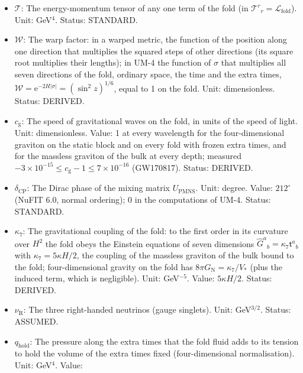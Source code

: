 \documentclass[
  10pt,
]{article}
\begin{document}
\begin{itemize}
  units of that of one neutrino species whose temperature is
  \((4/11)^{1/3}\) times that of the photons. Unit: dimensionless.
  Value: 3.044 (Standard Model); measured \(2.99 \pm 0.17\) (Planck
  2018). Status: STANDARD.
\item
  \(\mathcal{T}\): The energy-momentum tensor of any one term of the
  fold (in \(\mathcal{T}^r{}_r = \mathcal{L}_{\mathrm{fold}}\)). Unit:
  GeV\(^4\). Status: STANDARD.
\item
  \(\mathcal{W}\): The warp factor: in a warped metric, the function of
  the position along one direction that multiplies the squared steps of
  other directions (its square root multiplies their lengths); in UM-4
  the function of \(\sigma\) that multiplies all seven directions of the
  fold, ordinary space, the time and the extra times,
  \(\mathcal{W} = \mathrm{e}^{-2H\lvert\sigma\rvert} = (\sin^2z)^{1/6}\),
  equal to 1 on the fold. Unit: dimensionless. Status: DERIVED.
\item
  \(c_{\mathrm{g}}\): The speed of gravitational waves on the fold, in
  units of the speed of light. Unit: dimensionless. Value: 1 at every
  wavelength for the four-dimensional graviton on the static block and
  on every fold with frozen extra times, and for the massless graviton
  of the bulk at every depth; measured
  \(-3\times10^{-15} \le c_{\mathrm{g}} - 1 \le 7\times10^{-16}\)
  (GW170817). Status: DERIVED.
\item
  \(\delta_{\mathrm{CP}}\): The Dirac phase of the mixing matrix
  \(U_{\mathrm{PMNS}}\). Unit: degree. Value: \(212^\circ\) (NuFIT 6.0,
  normal ordering); 0 in the computations of UM-4. Status: STANDARD.
\item
  \(\kappa_7\): The gravitational coupling of the fold: to the first
  order in its curvature over \(H^2\) the fold obeys the Einstein
  equations of seven dimensions
  \(\hat G^a{}_b = \kappa_7\mathsf{t}^a{}_b\) with
  \(\kappa_7 = 5\kappa H/2\), the coupling of the massless graviton of
  the bulk bound to the fold; four-dimensional gravity on the fold has
  \(8\pi G_{\mathrm{N}} = \kappa_7/V_*\) (plus the induced term, which
  is negligible). Unit: GeV\(^{-5}\). Value: \(5\kappa H/2\). Status:
  DERIVED.
\item
  \(\nu_{\mathrm{R}}\): The three right-handed neutrinos (gauge
  singlets). Unit: GeV\(^{3/2}\). Status: ASSUMED.
\item
  \(q_{\mathrm{hold}}\): The pressure along the extra times that the
  fold fluid adds to its tension to hold the volume of the extra times
  fixed (four-dimensional normalisation). Unit: GeV\(^4\). Value:

\end{itemize}
\end{document}
